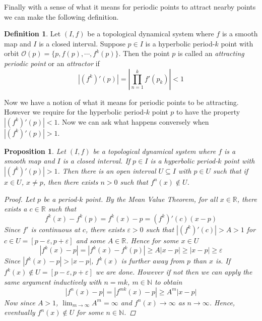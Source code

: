 \documentclass[11pt,a4paper,oneside]{memoir}
\theoremstyle{plain}
\newtheorem{prop}[thm]{Proposition}
\theoremstyle{definition}
\newtheorem{defn}[thm]{Definition}
\begin{document}
Finally with a sense of what it means for periodic points to attract nearby points we can make the following definition.

\begin{defn} \label{def:attractor}
    Let $(I, f)$ be a topological dynamical system where $f$ is a smooth map and $I$ is a closed interval. Suppose $p \in I$ is a hyperbolic period-$k$ point with orbit $\mathcal{O}(p) = \lbrace p, f(p), \cdots, f^k(p) \rbrace$. Then the point $p$ is called an \emph{attracting periodic point} or an \emph{attractor} if \[|(f^k)'(p)| = \left\lvert \prod_{n = 1}^k f'(p_k) \right\rvert < 1\]
\end{defn}

Now we have a notion of what it means for periodic points to be attracting. However we require for the hyperbolic period-$k$ point $p$ to have the property $|(f^k)'(p)| < 1$. Now we can ask what happens conversely when $|(f^k)'(p)| > 1$.

\begin{prop} \label{prop:repelling-point}
    Let $(I, f)$ be a topological dynamical system where $f$ is a smooth map and $I$ is a closed interval. If $p \in I$ is a hyperbolic period-$k$ point with $|(f^k)'(p)| > 1$. Then there is an open interval $U \subseteq I$ with $p \in U$ such that if $x \in U$, $x \neq p$, then there exists $n > 0$ such that $f^n(x) \notin U$.

    \begin{proof}
        Let $p$ be a period-$k$ point. By the Mean Value Theorem, for all $x \in \mathbb{R}$, there exists a $c \in \mathbb{R}$ such that \[f^k(x) - f^k(p) = f^k(x) - p = (f^k)'(c)(x - p)\] Since $f'$ is continuous at $c$, there exists $\varepsilon > 0$ such that $|(f^k)'(c)| > A > 1$ for $c \in U = [p - \varepsilon, p + \varepsilon]$ and some $A \in \mathbb{R}$. Hence for some $x \in U$ \[|f^k(x) - p| = |f^k(x) - f^k(p)| \geq A|x - p| \geq |x - p| \geq \varepsilon\] Since $|f^k(x) - p| > |x - p|$, $f^k(x)$ is further away from $p$ than $x$ is. If $f^k(x) \notin U = [p - \varepsilon, p + \varepsilon]$ we are done. However if not then we can apply the same argument inductively with $n = mk$, $m \in \mathbb{N}$ to obtain \[ |f^n(x) - p| = |f^{mk}(x) - p| \geq A^m|x - p|\] Now since $A > 1$, $\lim_{m \to \infty}A^m = \infty$ and $f^n(x) \to \infty$ as $n \to \infty$. Hence, eventually $f^n(x) \notin U$ for some $n \in \mathbb{N}$.
    \end{proof}
\end{prop}
\end{document}
